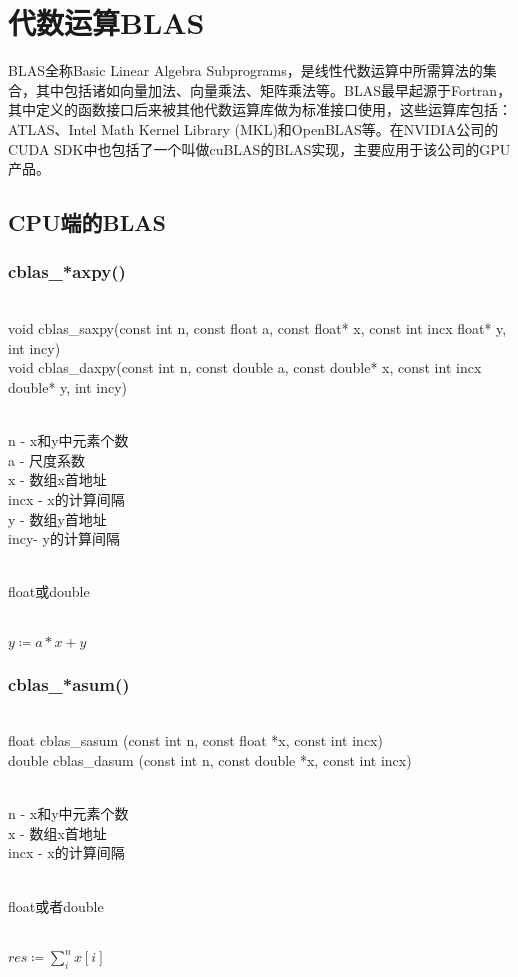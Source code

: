 \section{代数运算BLAS}
BLAS全称Basic Linear Algebra Subprograms，是线性代数运算中所需算法的集合，其中包括诸如向量加法、向量乘法、矩阵乘法等。BLAS最早起源于Fortran，其中定义的函数接口后来被其他代数运算库做为标准接口使用，这些运算库包括：ATLAS、Intel Math Kernel Library (MKL)和OpenBLAS等。在NVIDIA公司的CUDA SDK中也包括了一个叫做cuBLAS的BLAS实现，主要应用于该公司的GPU产品。
\subsection{CPU端的BLAS}\label{deps/blas/cpu}
\subsubsection{cblas\_*axpy()}
\begin{cnfrmfunc}
   \item{}\\ 
     void cblas\_saxpy(const int n, const float a, const float* x, const int incx float* y, int incy) \\
     void cblas\_daxpy(const int n, const double a, const double* x, const int incx double* y, int incy)
   \item{}\\
     n - x和y中元素个数\\
     a - 尺度系数\\
     x - 数组x首地址\\
     incx - x的计算间隔\\
     y - 数组y首地址\\
     incy- y的计算间隔
   \item{}\\
     float或double
   \item{}\\
     $y\coloneqq a*x+y$
\end{cnfrmfunc}
\subsubsection{cblas\_*asum()}
\begin{cnfrmfunc}
   \item{}\\ 
     float cblas\_sasum (const int n, const float *x, const int incx)\\
     double cblas\_dasum (const int n, const double *x, const int incx)
   \item{}\\
     n - x和y中元素个数\\
     x - 数组x首地址\\
     incx - x的计算间隔
   \item{}\\
     float或者double
   \item{}\\
     $res\coloneqq \sum\limits_{i}^{n}x[i]$
\end{cnfrmfunc}
